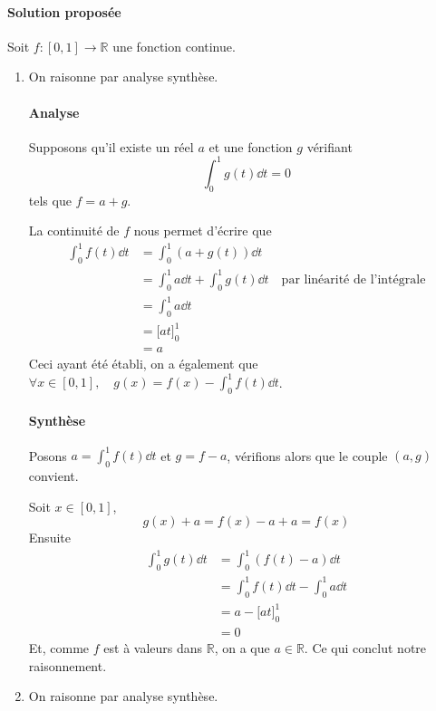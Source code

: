 \documentclass[10pt]{article}
\def\R{\mathbb R}
\begin{document}
    \paragraph{Solution proposée} Soit $f:[0,1]\to \R$ une fonction continue.
    \begin{enumerate}
        \item On raisonne par analyse synthèse.


        \paragraph{Analyse} Supposons qu'il existe un réel $a$ et une fonction $g$ vérifiant \[\int_0^1g(t)\dd t=0\] tels que $f=a+g$. 


        La continuité de $f$ nous permet d'écrire que
        \begin{align*}
            \int_0^1f(t)\dd t &= \int_0^1(a+g(t))\dd t\\
                              &= \int_0^1a\dd t+\int_0^1g(t)\dd t\quad \text{par linéarité de l'intégrale}\\
                              &= \int_0^1a\dd t\\
                              &= \Big[at\Big]_0^1\\
                              &= a
        \end{align*}
        Ceci ayant été établi, on a également que $\forall x\in[0,1],\quad g(x)=f(x)-\int_0^1f(t)\dd t$.


        \paragraph{Synthèse} Posons $a=\int_0^1f(t)\dd t$ et $g=f-a$, vérifions alors que le couple $(a,g)$ convient.


        Soit $x\in[0, 1]$, \[g(x)+a=f(x)-a+a=f(x)\]
        Ensuite
        \begin{align*}
            \int_0^1g(t)\dd t &= \int_0^1(f(t)-a)\dd t\\
                              &= \int_0^1f(t)\dd t-\int_0^1a\dd t\\
                              &= a - \Big[at\Big]_0^1\\
                              &= 0
        \end{align*}
        Et, comme $f$ est à valeurs dans $\R$, on a que $a\in\R$. Ce qui conclut notre raisonnement.

        \item On raisonne par analyse synthèse.


\end{enumerate}
\end{document}

